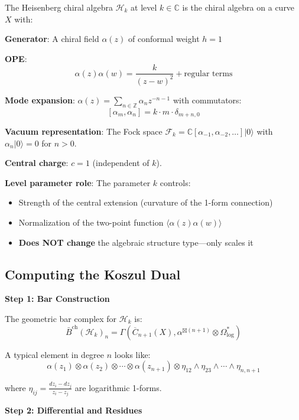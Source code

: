 \begin{definition}
\label{def:heisenberg-chiral}
The Heisenberg chiral algebra $\mathcal{H}_k$ at level $k \in \mathbb{C}$ is the chiral 
algebra on a curve $X$ with:

\textbf{Generator}: A chiral field $\alpha(z)$ of conformal weight $h = 1$

\textbf{OPE}: 
$$\alpha(z)\alpha(w) = \frac{k}{(z-w)^2} + \text{regular terms}$$

\textbf{Mode expansion}: $\alpha(z) = \sum_{n \in \mathbb{Z}} \alpha_n z^{-n-1}$ with commutators:
$$[\alpha_m, \alpha_n] = k \cdot m \cdot \delta_{m+n,0}$$

\textbf{Vacuum representation}: The Fock space $\mathcal{F}_k = \mathbb{C}[\alpha_{-1}, 
\alpha_{-2}, \ldots]|0\rangle$ with $\alpha_n|0\rangle = 0$ for $n > 0$.

\textbf{Central charge}: $c = 1$ (independent of $k$).

\textbf{Level parameter role}: The parameter $k$ controls:
\begin{itemize}
\item Strength of the central extension (curvature of the 1-form connection)
\item Normalization of the two-point function $\langle \alpha(z)\alpha(w) \rangle$
\item\textbf{Does NOT change} the algebraic structure type—only scales it
\end{itemize}
\end{definition}

\subsection{Computing the Koszul Dual}

\textbf{Step 1: Bar Construction}

The geometric bar complex for $\mathcal{H}_k$ is:
$$\bar{B}^{\text{ch}}(\mathcal{H}_k)_n = \Gamma\left(\overline{C}_{n+1}(X), 
   \alpha^{\boxtimes (n+1)} \otimes \Omega^*_{\log}\right)$$

A typical element in degree $n$ looks like:
$$\alpha(z_1) \otimes \alpha(z_2) \otimes \cdots \otimes \alpha(z_{n+1}) \otimes 
   \eta_{12} \wedge \eta_{23} \wedge \cdots \wedge \eta_{n,n+1}$$

where $\eta_{ij} = \frac{dz_i - dz_j}{z_i - z_j}$ are logarithmic 1-forms.

\textbf{Step 2: Differential and Residues}

